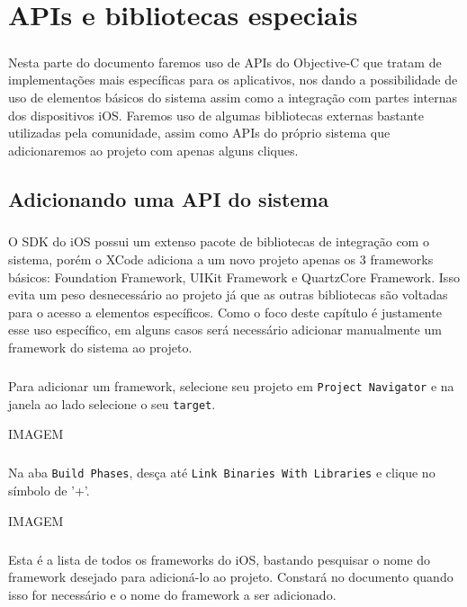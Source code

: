 \documentclass[a4paper,12pt,brazil,doubleside]{book}
\begin{document}
\chapter{APIs e bibliotecas especiais}

\paragraph{}Nesta parte do documento faremos uso de APIs do Objective-C que tratam de implementações mais específicas para os aplicativos, nos dando a possibilidade de uso de elementos básicos do sistema assim como a integração com partes internas dos dispositivos iOS. Faremos uso de algumas bibliotecas externas bastante utilizadas pela comunidade, assim como APIs do próprio sistema que adicionaremos ao projeto com apenas alguns cliques.


\section{Adicionando uma API do sistema}

\paragraph{}O SDK do iOS possui um extenso pacote de bibliotecas de integração com o sistema, porém o XCode adiciona a um novo projeto apenas os 3 frameworks básicos: Foundation Framework, UIKit Framework e QuartzCore Framework. Isso evita um peso desnecessário ao projeto já que as outras bibliotecas são voltadas para o acesso a elementos específicos. Como o foco deste capítulo é justamente esse uso específico, em alguns casos será necessário adicionar manualmente um framework do sistema ao projeto.
\paragraph{}Para adicionar um framework, selecione seu projeto em \texttt{Project Navigator} e na janela ao lado selecione o seu \texttt{target}.

IMAGEM

\paragraph{}Na aba \texttt{Build Phases}, desça até \texttt{Link Binaries With Libraries} e clique no símbolo de '+'.

IMAGEM

\paragraph{}Esta é a lista de todos os frameworks do iOS, bastando pesquisar o nome do framework desejado para adicioná-lo ao projeto. Constará no documento quando isso for necessário e o nome do framework a ser adicionado.
\end{document}
